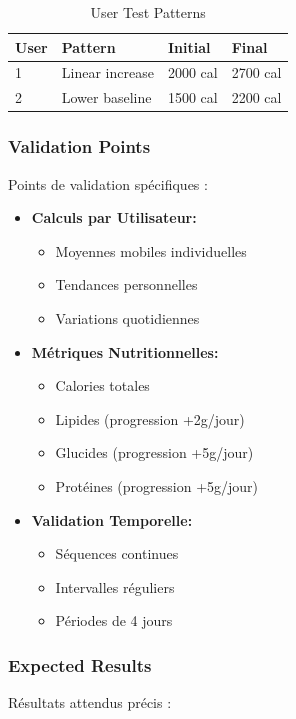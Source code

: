 \begin{table}[h]
    \centering
    \begin{tabular}{|l|l|l|l|}
        \hline
        \textbf{User} & \textbf{Pattern} & \textbf{Initial} & \textbf{Final} \\
        \hline
        1 & Linear increase & 2000 cal & 2700 cal \\
        2 & Lower baseline & 1500 cal & 2200 cal \\
        \hline
    \end{tabular}
    \caption{User Test Patterns}
\end{table}

\subsubsection{Validation Points}
Points de validation spécifiques :

\begin{itemize}
    \item \textbf{Calculs par Utilisateur:}
    \begin{itemize}
        \item Moyennes mobiles individuelles
        \item Tendances personnelles
        \item Variations quotidiennes
    \end{itemize}
    
    \item \textbf{Métriques Nutritionnelles:}
    \begin{itemize}
        \item Calories totales
        \item Lipides (progression +2g/jour)
        \item Glucides (progression +5g/jour)
        \item Protéines (progression +5g/jour)
    \end{itemize}
    
    \item \textbf{Validation Temporelle:}
    \begin{itemize}
        \item Séquences continues
        \item Intervalles réguliers
        \item Périodes de 4 jours
    \end{itemize}
\end{itemize}

\subsubsection{Expected Results}
Résultats attendus précis :


